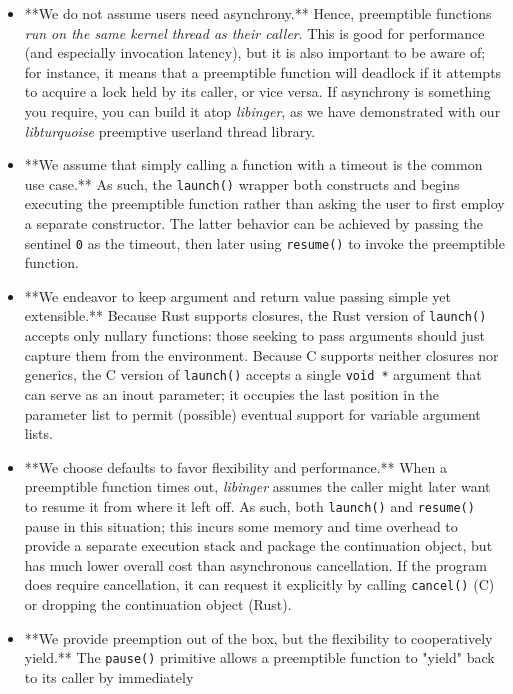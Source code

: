 \documentclass[12pt,letterpaper]{book}
\begin{document}
\begin{itemize}
\item **We do not assume users need asynchrony.**  Hence, preemptible functions \textit{run on the same kernel
	thread as their caller}.  This is good for performance (and especially invocation latency), but
	it is also important to be aware of; for instance, it means that a preemptible function will
	deadlock if it attempts to acquire a lock held by its caller, or vice versa.  If asynchrony is
	something you require, you can build it atop \textit{libinger}, as we have demonstrated with our
	\textit{libturquoise} preemptive userland thread library.
\item **We assume that simply calling a function with a timeout is the common use case.**  As such, the
	\texttt{launch()} wrapper both constructs and begins executing the preemptible function rather than
	asking the user to first employ a separate constructor.  The latter behavior can be achieved by
	passing the sentinel \texttt{0} as the timeout, then later using \texttt{resume()} to invoke the preemptible
	function.
\item **We endeavor to keep argument and return value passing simple yet extensible.**  Because Rust
	supports closures, the Rust version of \texttt{launch()} accepts only nullary functions: those seeking
	to pass arguments should just capture them from the environment.  Because C supports neither
	closures nor generics, the C version of \texttt{launch()} accepts a single \texttt{void *} argument that can
	serve as an inout parameter; it occupies the last position in the parameter list to permit
	(possible) eventual support for variable argument lists.
\item **We choose defaults to favor flexibility and performance.**  When a preemptible function times
	out, \textit{libinger} assumes the caller might later want to resume it from where it left off.  As
	such, both \texttt{launch()} and \texttt{resume()} pause in this situation; this incurs some memory and time
	overhead to provide a separate execution stack and package the continuation object, but has much
	lower overall cost than asynchronous cancellation.  If the program does require cancellation, it
	can request it explicitly by calling \texttt{cancel()} (C) or dropping the continuation object (Rust).
\item **We provide preemption out of the box, but the flexibility to cooperatively yield.**  The
	\texttt{pause()} primitive allows a preemptible function to "yield" back to its caller by immediately

\end{itemize}
\end{document}
